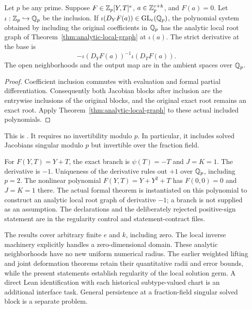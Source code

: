 \begin{corollary}
\label{cor:integral-analytic-graph}
Let $p$ be any prime. Suppose $F\in\mathbb Z_p[Y,T]^e$, $a\in\mathbb Z_p^{e+k}$,
and $F(a)=0$. Let $\iota:\mathbb Z_p\hookrightarrow\mathbb Q_p$ be the inclusion.
If $\iota(D_YF(a))\in\operatorname{GL}_e(\mathbb Q_p)$, the polynomial system
obtained by including the original coefficients in $\mathbb Q_p$ has the analytic
local root graph of Theorem~\ref{thm:analytic-local-graph} at $\iota(a)$.
The strict derivative at the base is
\[
 -\iota(D_YF(a))^{-1}\iota(D_TF(a)).
\]
The open neighborhoods and the output map are in the ambient spaces over
$\mathbb Q_p$.
\end{corollary}
\begin{proof}
Coefficient inclusion commutes with evaluation and formal partial
differentiation. Consequently both Jacobian blocks after inclusion are the
entrywise inclusions of the original blocks, and the original exact root
remains an exact root. Apply Theorem~\ref{thm:analytic-local-graph} to these
actual included polynomials.
\end{proof}
This is
.
It requires no invertibility modulo $p$. In particular, it includes solved
Jacobians singular modulo $p$ but invertible over the fraction field.

\begin{example}
For $F(Y,T)=Y+T$, the exact branch is $\psi(T)=-T$ and $J=K=1$.
The derivative is $-1$. Uniqueness of the derivative rules out $+1$ over
$\mathbb Q_p$, including $p=2$. The nonlinear polynomial $F(Y,T)=Y+Y^2+T$
has $F(0,0)=0$ and $J=K=1$ there. The actual formal theorem is instantiated
on this polynomial to construct an analytic local root graph of derivative
$-1$; a branch is not supplied as an assumption.
The declarations and the deliberately rejected positive-sign statement are
in the regularity control and statement-contract files.
\end{example}

The results cover arbitrary finite $e$ and $k$, including zero. The local
inverse machinery explicitly handles a zero-dimensional domain. These
analytic neighborhoods have no new uniform numerical radius. The earlier
weighted lifting and joint deformation theorems retain their quantitative
radii and error bounds, while the present statements establish regularity
of the local solution germ. A direct Lean identification with each
historical subtype-valued chart is an additional interface task. General
persistence at a fraction-field singular solved block is a separate problem.
